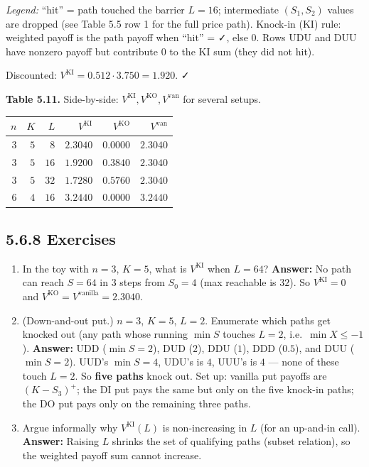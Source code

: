 \documentclass[
  10pt,
  twoside]{book}
\newcounter{none} %
\providecommand{\tightlist}{%
  \setlength{\itemsep}{0pt}\setlength{\parskip}{0pt}}
\begin{document}
\emph{Legend:} ``hit'' = path touched the barrier \(L = 16\);
intermediate \((S_1, S_2)\) values are dropped (see Table 5.5 row 1 for
the full price path). Knock-in (KI) rule: weighted payoff is the path
payoff when ``hit'' = ✓, else \(0\). Rows UDU and DUU have nonzero
payoff but contribute \(0\) to the KI sum (they did not hit).

Discounted: \(V^{\text{KI}} = 0.512 \cdot 3.750 = 1.920\). ✓

\textbf{Table 5.11.} Side-by-side:
\(V^{\text{KI}}, V^{\text{KO}}, V^{\text{van}}\) for several setups.

{\def\LTcaptype{none} %
\begin{table}[H]
\centering
\begin{tabular}{|r|r|r|r|r|r|}
\toprule
\(n\) & \(K\) & \(L\) & \(V^{\text{KI}}\) & \(V^{\text{KO}}\) & \(V^{\text{van}}\) \\
\midrule



\(3\) & \(5\) & \(8\) & \(2.3040\) & \(0.0000\) & \(2.3040\) \\
\(3\) & \(5\) & \(16\) & \(1.9200\) & \(0.3840\) & \(2.3040\) \\
\(3\) & \(5\) & \(32\) & \(1.7280\) & \(0.5760\) & \(2.3040\) \\
\(6\) & \(4\) & \(16\) & \(3.2440\) & \(0.0000\) & \(3.2440\) \\
\bottomrule
\end{tabular}
\end{table}
}

\subsection{5.6.8 Exercises}\label{exercises-24}

\begin{enumerate}
\def\labelenumi{\arabic{enumi}.}
\tightlist
\item
  In the toy with \(n = 3\), \(K = 5\), what is \(V^{\text{KI}}\) when
  \(L = 64\)? \textbf{Answer:} No path can reach \(S = 64\) in 3 steps
  from \(S_0 = 4\) (max reachable is \(32\)). So \(V^{\text{KI}} = 0\)
  and \(V^{\text{KO}} = V^{\text{vanilla}} = 2.3040\).
\item
  (Down-and-out put.) \(n = 3\), \(K = 5\), \(L = 2\). Enumerate which
  paths get knocked out (any path whose running \(\min S\) touches
  \(L = 2\), i.e.~\(\min X \le -1\)). \textbf{Answer:} UDD
  (\(\min S = 2\)), DUD (\(2\)), DDU (\(1\)), DDD (\(0.5\)), and DUU
  (\(\min S = 2\)). UUD's \(\min S = 4\), UDU's is \(4\), UUU's is \(4\)
  --- none of these touch \(L = 2\). So \textbf{five paths} knock out.
  Set up: vanilla put payoffs are \((K - S_3)^+\); the DI put pays the
  same but only on the five knock-in paths; the DO put pays only on the
  remaining three paths.
\item
  Argue informally why \(V^{\text{KI}}(L)\) is non-increasing in \(L\)
  (for an up-and-in call). \textbf{Answer:} Raising \(L\) shrinks the
  set of qualifying paths (subset relation), so the weighted payoff sum
  cannot increase.
\end{enumerate}
\end{document}
